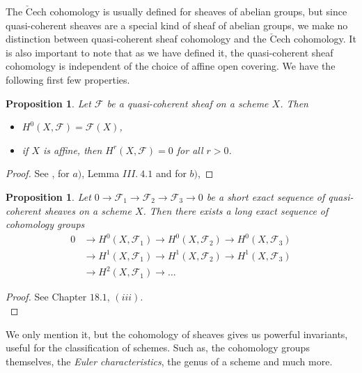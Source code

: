 \documentclass{article}
\theoremstyle{plain}
\newtheorem{proposition}[theorem]{Proposition}
\theoremstyle{definition}
\begin{document}
\noindent The $\check{\text{C}}$ech cohomology is usually defined for sheaves of abelian groups, but since quasi-coherent sheaves are a special kind of sheaf of abelian groups, we make no distinction between quasi-coherent sheaf cohomology and the $\check{\text{C}}$ech cohomology.
It is also important to note that as we have defined it, the quasi-coherent sheaf cohomology is independent of the choice of affine open covering.
We have the following first few properties. 

\begin{proposition}
    Let $\mathcal{F}$ be a quasi-coherent sheaf on a scheme $X$. Then
    \begin{itemize}
        \item[$a)$] $H^0(X,\mathcal{F}) = \mathcal{F}(X)$,
        \item[$b)$] if $X$ is affine, then $H^r(X,\mathcal{F}) = 0$ for all $r> 0$.
    \end{itemize}
\end{proposition}
\begin{proof}
    See \cite{Hartshorne}, for $a)$, Lemma $III.\: 4.1$ and for $b)$, 
\end{proof}


\begin{proposition}
    Let $0\rightarrow \mathcal{F}_1\rightarrow\mathcal{F}_2\rightarrow\mathcal{F}_3\rightarrow 0$ be a short exact sequence of quasi-coherent sheaves on a scheme $X$.
    Then there exists a long exact sequence of cohomology groups 
    \begin{equation*}
    \begin{split}
        0&\rightarrow H^0(X,\mathcal{F_\text{1}}) \rightarrow H^0(X,\mathcal{F_\text{2}}) \rightarrow H^0(X,\mathcal{F_\text{3}})\\
        &\rightarrow H^1(X,\mathcal{F_\text{1}}) \rightarrow H^1(X,\mathcal{F_\text{2}}) \rightarrow H^1(X,\mathcal{F_\text{3}})\\
        &\rightarrow H^2(X,\mathcal{F_\text{1}}) \rightarrow \dots
    \end{split}
    \end{equation*}
\end{proposition}
\begin{proof}
    See \cite{Vakil} Chapter $18.1$, $(iii)$.\\
\end{proof}

\noindent We only mention it, but the cohomology of sheaves gives us powerful invariants, useful for the classification of schemes.
Such as, the cohomology groups themselves, the \textit{Euler characteristics}, the genus of a scheme and much more.
\end{document}
